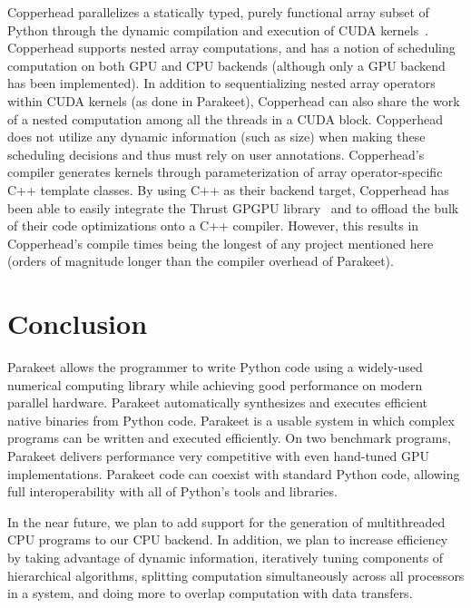 \documentclass[10pt,twocolumn]{article}
\begin{document}
Copperhead parallelizes a statically typed, purely functional array subset of Python through the dynamic compilation and execution of CUDA kernels~\cite{Cata11}. Copperhead supports nested array computations, and has a notion of scheduling computation on both GPU and CPU backends (although only a GPU backend has been implemented). In addition to sequentializing nested array operators within CUDA kernels (as done in Parakeet), Copperhead can also share the work of a nested computation among all the threads in a CUDA block. Copperhead does not utilize any dynamic information (such as size) when making these scheduling decisions and thus must rely on user annotations. Copperhead's compiler generates kernels through parameterization of array operator-specific C++ template classes. By using C++ as their backend target, Copperhead has been able to easily integrate the Thrust GPGPU library~\cite{Hobe10} and to offload the bulk of their code optimizations onto a C++ compiler.  However, this results in Copperhead's compile times being the longest of any project mentioned here (orders of magnitude longer than the compiler overhead of Parakeet).

\section{Conclusion}
\label{Conclusion}
Parakeet allows the programmer to write Python code using a widely-used numerical computing library while achieving good performance on modern parallel hardware. Parakeet automatically synthesizes and executes efficient native binaries from Python code. Parakeet is a usable system in which complex programs can be written and executed efficiently.  On two benchmark programs, Parakeet delivers performance very competitive with even hand-tuned GPU implementations.  Parakeet code can coexist with standard Python code, allowing full interoperability with all of Python's tools and libraries.

In the near future, we plan to add support for the generation of multithreaded CPU programs to our CPU backend.  In addition, we plan to increase efficiency by taking advantage of dynamic information, iteratively tuning components of hierarchical algorithms, splitting computation simultaneously across all processors in a system, and doing more to overlap computation with data transfers.

{\small

{}
}
\end{document}
